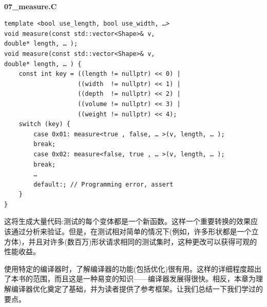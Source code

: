 \hspace*{\fill} \\ %
\noindent
\textbf{07\_measure.C}
\begin{lstlisting}[style=styleCXX]
template <bool use_length, bool use_width, …>
void measure(const std::vector<Shape>& v,
double* length, … );
void measure(const std::vector<Shape>& v,
double* length, … ) {
	const int key = ((length != nullptr) << 0) |
					((width  != nullptr) << 1) |
				    ((depth  != nullptr) << 2) |
				    ((volume != nullptr) << 3) |
				    ((weight != nullptr) << 4);
	switch (key) {
		case 0x01: measure<true , false, … >(v, length, … );
		break;
		case 0x02: measure<false, true , … >(v, length, … );
		break;
		…
		default:; // Programming error, assert
	}
}
\end{lstlisting}

这将生成大量代码:测试的每个变体都是一个新函数。这样一个重要转换的效果应该通过分析来验证。但是，在测试相对简单的情况下(例如，许多形状都是一个立方体)，并且对许多(数百万)形状请求相同的测试集时，这种更改可以获得可观的性能收益。 

使用特定的编译器时，了解编译器的功能(包括优化)很有用。这样的详细程度超出了本书的范围，而且这是一种易变的知识——编译器发展得很快。相反，本章为理解编译器优化奠定了基础，并为读者提供了参考框架。让我们总结一下我们学过的要点。


